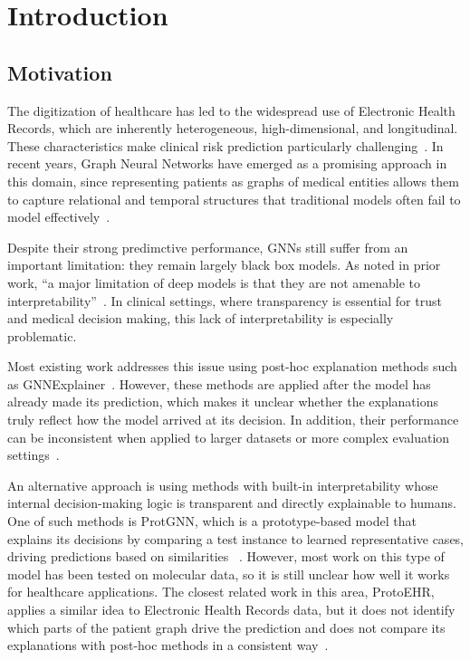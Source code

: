 \chapter{Introduction}\label{introduction}

\section{Motivation}
The digitization of healthcare has led to the widespread use of Electronic Health Records, which are inherently heterogeneous, high-dimensional, and longitudinal. These characteristics make clinical risk prediction particularly challenging~\cite{ossboll2024gnn}. In recent years, Graph Neural Networks have emerged as a promising approach in this domain, since representing patients as graphs of medical entities allows them to capture relational and temporal structures that traditional models often fail to model effectively~\cite{ossboll2024gnn,mesinovic2026dynagraph}.

Despite their strong predimctive performance, GNNs still suffer from an important limitation: they remain largely black box models. As noted in prior work, ``a major limitation of deep models is that they are not amenable to interpretability''~\cite{yuan2022explainability}. In clinical settings, where transparency is essential for trust and medical decision making, this lack of interpretability is especially problematic.

Most existing work addresses this issue using post-hoc explanation methods such as GNNExplainer~\cite{ying2019gnnexplainer}. However, these methods are applied after the model has already made its prediction, which makes it unclear whether the explanations truly reflect how the model arrived at its decision. In addition, their performance can be inconsistent when applied to larger datasets or more complex evaluation settings~\cite{agarwal2023graphxai}.

An alternative approach is using methods with built-in interpretability whose internal decision-making logic is transparent and directly explainable to humans. One of such methods is ProtGNN, which is a prototype-based model that explains its decisions by comparing a test instance to learned representative cases, driving predictions based on similarities ~\cite{zhang2022protgnn}. However, most work on this type of model has been tested on molecular data, so it is still unclear how well it works for healthcare applications. The closest related work in this area, ProtoEHR, applies a similar idea to Electronic Health Records data, but it does not identify which parts of the patient graph drive the prediction and does not compare its explanations with post-hoc methods in a consistent way~\cite{cai2025protoehr}.

